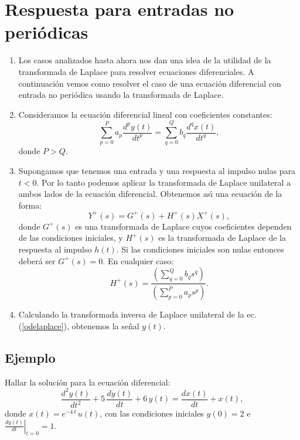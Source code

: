 \documentclass[11pt,a4paper,openany]{book}
\begin{document}
\section{Respuesta para entradas no peri\'{o}dicas}

\begin{enumerate}
	\item Los casos analizados hasta ahora nos dan una idea de la utilidad de la transformada de Laplace para resolver ecuaciones diferenciales. A continuaci\'{o}n vemos como resolver el caso de una ecuaci\'{o}n diferencial con entrada no peri\'{o}dica usando la transformada de Laplace.
	
	\item Consideramos la ecuaci\'{o}n diferencial lineal con coeficientes constantes:
	\begin{equation}
		\sum_{p=0}^{P}a_{p}\frac{d^{p}y\left( t\right) }{dt^{p}}=
		\sum_{q=0}^{Q}b_{q}\frac{d^{q}x\left( t\right) }{dt^{q}},
	\end{equation}
	donde $P > Q$.
	
	\item Supongamos que tenemos una entrada y una respuesta al impulso nulas para $t < 0$. Por lo tanto podemos aplicar la transformada de Laplace unilateral a ambos lados de la ecuaci\'{o}n diferencial. Obtenemos as\'{\i} una ecuaci\'{o}n de la forma:
	\begin{equation}
		Y^{+}(s) = G^{+}(s) + H^{+}(s) X^{+}(s), \label{odelaplace}
	\end{equation}
	donde $G^{+}(s)$ es una transformada de Laplace cuyos coeficientes dependen de las condiciones iniciales, y $H^{+}(s)$ es la transformada de Laplace de la respuesta al impulso $h(t)$. Si las condiciones iniciales son nulas entonces deber\'{a} ser $G^{+}(s) = 0$. En cualquier caso:
	\begin{equation}
		H^{+}(s) = \frac{\left( \sum_{q=0}^{Q}b_{q}s^{q}\right) }{\left(\sum_{p=0}^{P}a_{p}s^{p}\right) }.
	\end{equation}
	
	\item Calculando la transformada inversa de Laplace unilateral de la ec. (\ref{odelaplace}), obtenemos la se\~{n}al $y(t)$.
\end{enumerate}

\subsection{Ejemplo}

Hallar la soluci\'{o}n para la ecuaci\'{o}n diferencial:
\begin{equation}
	\frac{d^{2}y(t)}{dt^{2}} + 5 \, \frac{dy(t)}{dt} + 6 \, y(t) = 
	\frac{dx(t)}{dt} + x(t),
\end{equation}
donde $x(t) = e^{-4 \, t} \, u(t)$, con las condiciones iniciales $y(0) = 2$ e $\left. \frac{dy(t)}{dt} \right|_{t=0} = 1$.
\end{document}
